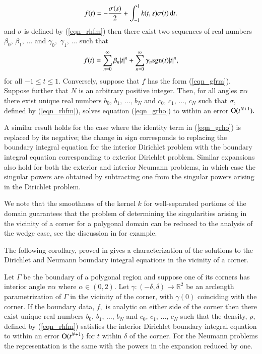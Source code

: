 \begin{theorem}
\begin{align}
f(t) = -\frac{\sigma(s)}{2} +\int_{-1}^1 k(t,s)  \sigma(t)\,{\rm d}t.
\label{eqn_grho}
\end{align}
and $\sigma$ is defined by (\ref{eqn_rhfm}) then there exist two sequences of real numbers $\beta_0$, $\beta_1,\,\dots$ and $\gamma_0,$ $\gamma_1,\,\dots$ such that
\begin{align}
f(t) = \sum_{n=0}^\infty\beta_n |t|^n + \sum_{n=0}^\infty \gamma_n {\rm sgn}(t) |t|^n,
\label{eqn_gfrm}
\end{align}
for all $-1 \le t \le 1.$ Conversely, suppose that $f$ has the form (\ref{eqn_gfrm}). Suppose further that $N$ is an arbitrary positive integer. Then, for all angles $\pi \alpha$ there exist unique real numbers $b_0,\,b_1,\,\dots,\,b_N$ and $c_0,\,c_1,\,\dots,\,c_N$ such that $\sigma,$ defined by (\ref{eqn_rhfm}), solves equation  (\ref{eqn_grho}) to within an error ${\rm O}(t^{N+1}).$ 
\end{theorem}

\begin{remark1}
A similar result holds for the case where the identity term in (\ref{eqn_grho}) is replaced by its negative; the change in sign corresponds to replacing the boundary integral equation for the interior Dirichlet problem with the boundary integral equation corresponding to exterior Dirichlet problem. Similar expansions also hold for both the exterior and interior Neumann problems, in which case the singular powers are obtained by subtracting one from the singular powers arising in the Dirichlet problem.
\end{remark1}

{\color{olive}
\begin{remark1}
We note that the smoothness of the kernel $k$ for well-separated portions of the domain guarantees that the problem of determining the singularities arising in the vicinity of a corner for a polygonal domain can be reduced to the analysis of the wedge case, see the discussion in \cite{} for example.
\end{remark1}
}

The following corollary, proved in \cite{serkhacha} gives a characterization of the solutions to the Dirichlet and Neumann boundary integral equations in the vicinity of a corner.

\begin{corollary}
Let $\Gamma$ be the boundary of a polygonal region and suppose one of its corners has interior angle $\pi \alpha$ where $\alpha \in (0,2).$ Let $\gamma:(-\delta,\delta) \rightarrow \mathbb{R}^2$ be an arclength parametrization of $\Gamma$ in the vicinity of the corner, with $\gamma(0)$ coinciding with the corner. If the boundary data, $f,$ is analytic on either side of the corner then there exist unique real numbers $b_0,\,b_1,\,\dots,\,b_N$ and $c_0,\,c_1,\,\dots,\,c_N$ such that the density, $\rho,$ defined by (\ref{eqn_rhfm}) satisfies the interior Dirichlet boundary integral equation to within an error ${\rm O}(t^{N+1})$ for $t$ within $\delta$ of the corner. For the Neumann problems the representation is the same with the powers in the expansion reduced by one.
\end{corollary}
